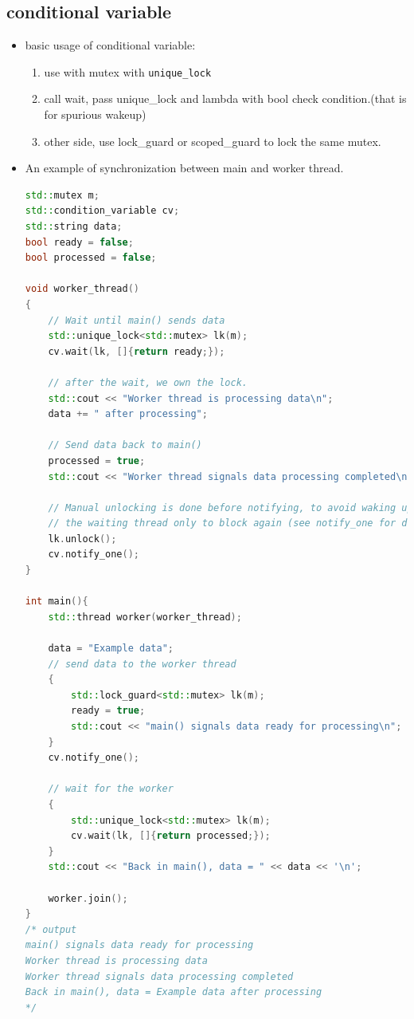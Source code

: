 \documentclass[a4paper,11pt,twoside]{book}
\begin{document}
\subsection{conditional variable}
\begin{itemize}
	\item basic usage of conditional variable:
\begin{enumerate}
	\item use with mutex with \texttt{unique\_lock} 
	\item call wait, pass unique\_lock and lambda with bool check condition.(that is for spurious wakeup)
	\item other side, use lock\_guard or scoped\_guard to lock the same mutex.
\end{enumerate}

\item An example of synchronization between main and worker thread.
\begin{lstlisting}[frame=single, language=c++]
std::mutex m;
std::condition_variable cv;
std::string data;
bool ready = false;
bool processed = false;

void worker_thread()
{
	// Wait until main() sends data
	std::unique_lock<std::mutex> lk(m);
	cv.wait(lk, []{return ready;});
	
	// after the wait, we own the lock.
	std::cout << "Worker thread is processing data\n";
	data += " after processing";
	
	// Send data back to main()
	processed = true;
	std::cout << "Worker thread signals data processing completed\n";
	
	// Manual unlocking is done before notifying, to avoid waking up
	// the waiting thread only to block again (see notify_one for details)
	lk.unlock();
	cv.notify_one();
}

int main(){
	std::thread worker(worker_thread);
	
	data = "Example data";
	// send data to the worker thread
	{
		std::lock_guard<std::mutex> lk(m);
		ready = true;
		std::cout << "main() signals data ready for processing\n";
	}
	cv.notify_one();
	
	// wait for the worker
	{
		std::unique_lock<std::mutex> lk(m);
		cv.wait(lk, []{return processed;});
	}
	std::cout << "Back in main(), data = " << data << '\n';
	
	worker.join();
}
/* output
main() signals data ready for processing
Worker thread is processing data
Worker thread signals data processing completed
Back in main(), data = Example data after processing
*/	
\end{lstlisting}



\end{itemize}
\end{document}
